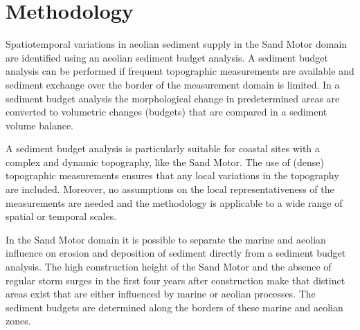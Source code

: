 \section{Methodology}

Spatiotemporal variations in aeolian sediment supply in the Sand Motor
domain are identified using an aeolian sediment budget analysis. A
sediment budget analysis can be performed if frequent topographic
measurements are available \citep{DavidsonArnott1990} and sediment
exchange over the border of the measurement domain is limited. In a
sediment budget analysis the morphological change in predetermined
areas are converted to volumetric changes (budgets) that are compared
in a sediment volume balance.

A sediment budget analysis is particularly suitable for coastal sites
with a complex and dynamic topography, like the Sand Motor. The use of
(dense) topographic measurements ensures that any local variations in
the topography are included. Moreover, no assumptions on the local
representativeness of the measurements are needed and the methodology
is applicable to a wide range of spatial or temporal scales.

In the Sand Motor domain it is possible to separate the marine and
aeolian influence on erosion and deposition of sediment directly from
a sediment budget analysis. The high construction height of the Sand
Motor and the absence of regular storm surges in the first four years
after construction make that distinct areas exist that are either
influenced by marine or aeolian processes. The sediment budgets are
determined along the borders of these marine and aeolian zones.

%
%

